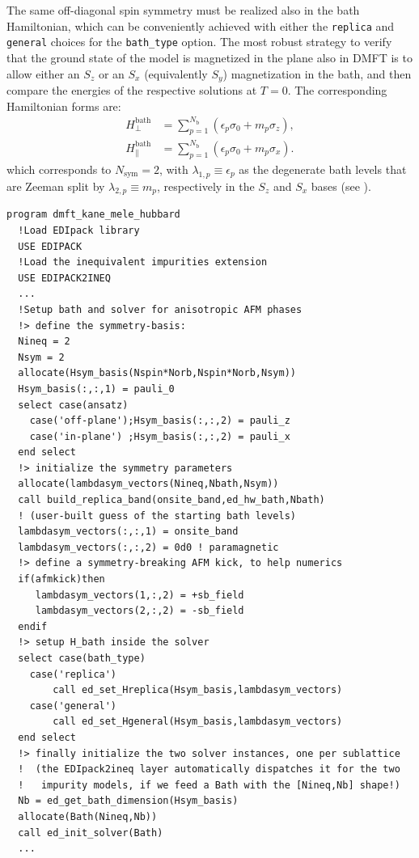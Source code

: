 \documentclass[edipack_sp.tex]{subfiles}
\begin{document}
The same off-diagonal spin symmetry must be realized also in
the bath Hamiltonian, which can be conveniently achieved with
either the \texttt{replica} and \texttt{general} choices for 
the \texttt{bath\_type} option. The most robust strategy to
verify that the ground state of the model is magnetized in the
plane also in DMFT is to allow either an $S_z$ or an $S_x$ (equivalently $S_y$) magnetization in the bath, and then
compare the energies of the respective solutions at $T=0$. 
The corresponding Hamiltonian forms are:
\begin{align}
    H^\mathrm{bath}_\perp &= 
        \sum_{p=1}^{N_\mathrm{b}}(\epsilon_p \sigma_0 + m_p \sigma_z), 
        \label{eq:afmz_dmft_ansatz} \\[1mm]
    H^\mathrm{bath}_\parallel &= 
        \sum_{p=1}^{N_\mathrm{b}}(\epsilon_p \sigma_0 + m_p \sigma_x).
        \label{eq:afmx_dmft_ansatz}
\end{align}
which corresponds to $N_\mathrm{sym}=2$, with
$\lambda_{1,p} \equiv \epsilon_p$ as the degenerate
bath levels that are Zeeman split by $\lambda_{2,p} \equiv m_p$, respectively in the $S_z$ and $S_x$ bases 
(see ).

\begin{lstlisting}[style=fstyle,numbers=none,basicstyle={\scriptsize\ttfamily}]
program dmft_kane_mele_hubbard
  !Load EDIpack library 
  USE EDIPACK
  !Load the inequivalent impurities extension
  USE EDIPACK2INEQ
  ...
  !Setup bath and solver for anisotropic AFM phases
  !> define the symmetry-basis:
  Nineq = 2
  Nsym = 2
  allocate(Hsym_basis(Nspin*Norb,Nspin*Norb,Nsym))
  Hsym_basis(:,:,1) = pauli_0
  select case(ansatz)
    case('off-plane');Hsym_basis(:,:,2) = pauli_z
    case('in-plane') ;Hsym_basis(:,:,2) = pauli_x
  end select
  !> initialize the symmetry parameters
  allocate(lambdasym_vectors(Nineq,Nbath,Nsym))
  call build_replica_band(onsite_band,ed_hw_bath,Nbath)
  ! (user-built guess of the starting bath levels)
  lambdasym_vectors(:,:,1) = onsite_band 
  lambdasym_vectors(:,:,2) = 0d0 ! paramagnetic
  !> define a symmetry-breaking AFM kick, to help numerics
  if(afmkick)then
     lambdasym_vectors(1,:,2) = +sb_field
     lambdasym_vectors(2,:,2) = -sb_field
  endif
  !> setup H_bath inside the solver
  select case(bath_type)
    case('replica')
        call ed_set_Hreplica(Hsym_basis,lambdasym_vectors)
    case('general')
        call ed_set_Hgeneral(Hsym_basis,lambdasym_vectors)
  end select
  !> finally initialize the two solver instances, one per sublattice
  !  (the EDIpack2ineq layer automatically dispatches it for the two
  !   impurity models, if we feed a Bath with the [Nineq,Nb] shape!)
  Nb = ed_get_bath_dimension(Hsym_basis)
  allocate(Bath(Nineq,Nb))
  call ed_init_solver(Bath)
  ... 
\end{lstlisting}
\end{document}
